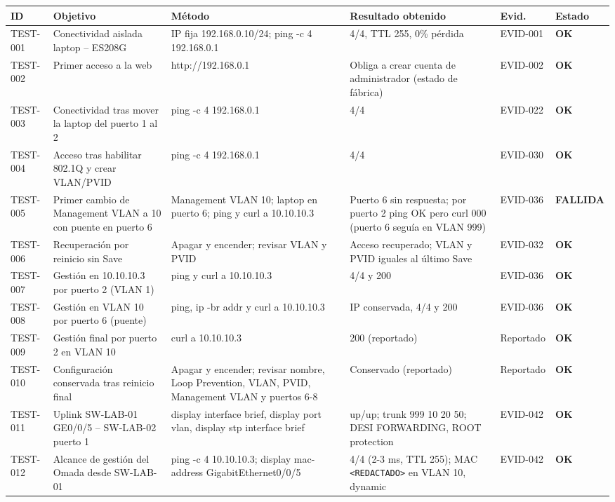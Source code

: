 \documentclass[11pt,a4paper]{article}
\newcommand{\estado}[1]{%
  \ifstrequal{#1}{COMPLETADA}{\textcolor{okgreen}{\textbf{\footnotesize #1}}}{%
  \ifstrequal{#1}{OPERATIVO VALIDADO}{\textcolor{okgreen}{\textbf{\footnotesize #1}}}{%
  \ifstrequal{#1}{OK}{\textcolor{okgreen}{\textbf{\footnotesize #1}}}{%
  \ifstrequal{#1}{RESUELTO}{\textcolor{okgreen}{\textbf{\footnotesize #1}}}{%
  \ifstrequal{#1}{EN CURSO}{\textcolor{amber}{\textbf{\footnotesize #1}}}{%
  \ifstrequal{#1}{REPORTADO}{\textcolor{amber}{\textbf{\footnotesize #1}}}{%
  \ifstrequal{#1}{NO EJECUTADA}{\textcolor{muted}{\textbf{\footnotesize #1}}}{%
  \ifstrequal{#1}{PROPUESTO}{\textcolor{violet}{\textbf{\footnotesize #1}}}{%
  \ifstrequal{#1}{PENDIENTE}{\textcolor{alertred}{\textbf{\footnotesize #1}}}{%
  \textbf{\footnotesize #1}}}}}}}}}}}
\newcommand{\cab}{\rowcolor{light}}
\begin{document}
{\footnotesize\setlength{\tabcolsep}{4pt}
\begin{longtable}{L{1.35cm} L{2.7cm} L{3.0cm} L{3.6cm} L{1.6cm} L{2.35cm}}
  \toprule
  \cab\textbf{ID} & \textbf{Objetivo} & \textbf{Método} & \textbf{Resultado obtenido} & \textbf{Evid.} & \textbf{Estado}\\
  \midrule
  \endhead
  TEST-001 & Conectividad aislada laptop -- ES208G & IP fija 192.168.0.10/24; ping -c 4 192.168.0.1 & 4/4, TTL 255, 0\% pérdida & EVID-001 & \estado{OK}\\
  TEST-002 & Primer acceso a la web & http://192.168.0.1 & Obliga a crear cuenta de administrador (estado de fábrica) & EVID-002 & \estado{OK}\\
  TEST-003 & Conectividad tras mover la laptop del puerto 1 al 2 & ping -c 4 192.168.0.1 & 4/4 & EVID-022 & \estado{OK}\\
  TEST-004 & Acceso tras habilitar 802.1Q y crear VLAN/PVID & ping -c 4 192.168.0.1 & 4/4 & EVID-030 & \estado{OK}\\
  TEST-005 & Primer cambio de Management VLAN a 10 con puente en puerto 6 & Management VLAN 10; laptop en puerto 6; ping y curl a 10.10.10.3 & Puerto 6 sin respuesta; por puerto 2 ping OK pero curl 000 (puerto 6 seguía en VLAN 999) & EVID-036 & \estado{FALLIDA}\\
  TEST-006 & Recuperación por reinicio sin Save & Apagar y encender; revisar VLAN y PVID & Acceso recuperado; VLAN y PVID iguales al último Save & EVID-032 & \estado{OK}\\
  TEST-007 & Gestión en 10.10.10.3 por puerto 2 (VLAN 1) & ping y curl a 10.10.10.3 & 4/4 y 200 & EVID-036 & \estado{OK}\\
  TEST-008 & Gestión en VLAN 10 por puerto 6 (puente) & ping, ip -br addr y curl a 10.10.10.3 & IP conservada, 4/4 y 200 & EVID-036 & \estado{OK}\\
  TEST-009 & Gestión final por puerto 2 en VLAN 10 & curl a 10.10.10.3 & 200 (reportado) & Reportado & \estado{OK}\\
  TEST-010 & Configuración conservada tras reinicio final & Apagar y encender; revisar nombre, Loop Prevention, VLAN, PVID, Management VLAN y puertos 6-8 & Conservado (reportado) & Reportado & \estado{OK}\\
  TEST-011 & Uplink SW-LAB-01 GE0/0/5 -- SW-LAB-02 puerto 1 & display interface brief, display port vlan, display stp interface brief & up/up; trunk 999 10 20 50; DESI FORWARDING, ROOT protection & EVID-042 & \estado{OK}\\
  TEST-012 & Alcance de gestión del Omada desde SW-LAB-01 & ping -c 4 10.10.10.3; display mac-address GigabitEthernet\allowbreak{}0/0/5 & 4/4 (2-3 ms, TTL 255); MAC \texttt{<REDACTADO>} en VLAN 10, dynamic & EVID-042 & \estado{OK}\\

\end{longtable}}
\end{document}
